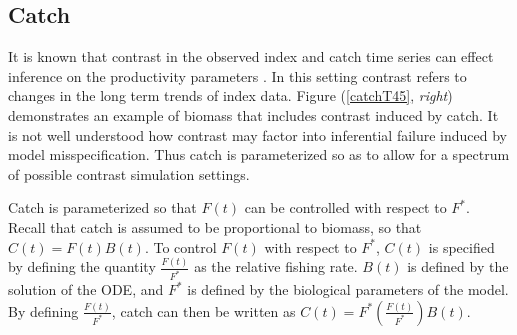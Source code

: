 
%
\subsection{Catch \label{catch}}


%
It is known that contrast in the observed index and catch time series %
can effect inference on the productivity parameters \cite{hilborn_quantitative_1992}. %
In this setting contrast refers to changes in the long term trends of index data.
Figure (\ref{catchT45}, \emph{right}) demonstrates an example of biomass that
includes contrast induced by catch. It is not well understood how contrast may
factor into inferential failure induced by model misspecification. Thus catch
is parameterized so as to allow for a spectrum of possible contrast simulation settings.

%
Catch is parameterized so that $F(t)$ can be controlled with respect to $F^*$.
Recall that catch is assumed to be proportional to biomass, so that $C(t)=F(t)B(t)$.
To control $F(t)$ with respect to $F^*$, $C(t)$ is specified by defining the
quantity $\frac{F(t)}{F^*}$ as the relative fishing rate. $B(t)$ is defined
by the solution of the ODE, and $F^*$ is defined by the biological parameters
of the model. By defining $\frac{F(t)}{F^*}$, catch can then be written as
\mbox{$C(t)=F^*\left(\frac{F(t)}{F^*}\right)B(t)$.}

